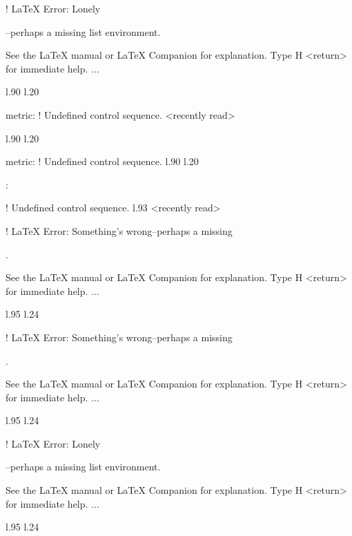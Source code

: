 {{{{{{{{{{{! LaTeX Error: Lonely \item--perhaps a missing list environment.

See the LaTeX manual or LaTeX Companion for explanation.
Type  H <return>  for immediate help.
 ...                                              
                                                  
l.90 l.20     \item \xmlNode
                            {metric}: \xmlDesc
! Undefined control sequence.
<recently read> \xmlNode 
                         
l.90 l.20     \item \xmlNode
                            {metric}: \xmlDesc
! Undefined control sequence.
l.90 l.20     \item {}: \xmlDesc
                                              
! Undefined control sequence.
l.93 <recently read> \xmlNode
                             

! LaTeX Error: Something's wrong--perhaps a missing \item.

See the LaTeX manual or LaTeX Companion for explanation.
Type  H <return>  for immediate help.
 ...                                              
                                                  
l.95 l.24     \item \xmlNode
                            

! LaTeX Error: Something's wrong--perhaps a missing \item.

See the LaTeX manual or LaTeX Companion for explanation.
Type  H <return>  for immediate help.
 ...                                              
                                                  
l.95 l.24     \item \xmlNode
                            

! LaTeX Error: Lonely \item--perhaps a missing list environment.

See the LaTeX manual or LaTeX Companion for explanation.
Type  H <return>  for immediate help.
 ...                                              
                                                  
l.95 l.24     \item \xmlNode
                            
}}}}}}}}}}}
